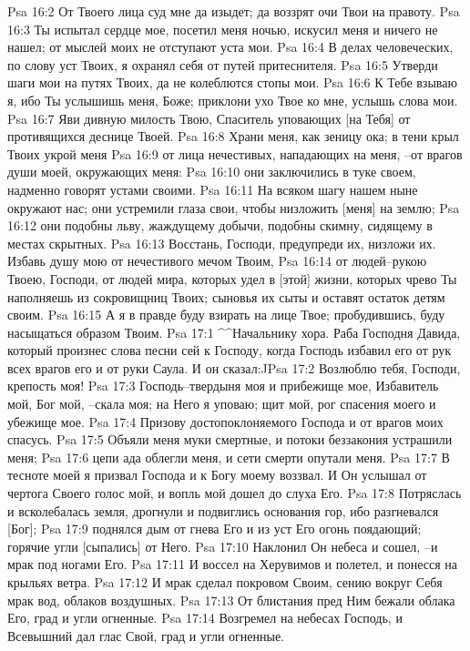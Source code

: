 Psa 16:2  От Твоего лица суд мне да изыдет; да воззрят очи Твои на правоту.
Psa 16:3  Ты испытал сердце мое, посетил меня ночью, искусил меня и ничего не нашел; от мыслей моих не отступают уста мои.
Psa 16:4  В делах человеческих, по слову уст Твоих, я охранял себя от путей притеснителя.
Psa 16:5  Утверди шаги мои на путях Твоих, да не колеблются стопы мои.
Psa 16:6  К Тебе взываю я, ибо Ты услышишь меня, Боже; приклони ухо Твое ко мне, услышь слова мои.
Psa 16:7  Яви дивную милость Твою, Спаситель уповающих [на Тебя] от противящихся деснице Твоей.
Psa 16:8  Храни меня, как зеницу ока; в тени крыл Твоих укрой меня
Psa 16:9  от лица нечестивых, нападающих на меня, --от врагов души моей, окружающих меня:
Psa 16:10  они заключились в туке своем, надменно говорят устами своими.
Psa 16:11  На всяком шагу нашем ныне окружают нас; они устремили глаза свои, чтобы низложить [меня] на землю;
Psa 16:12  они подобны льву, жаждущему добычи, подобны скимну, сидящему в местах скрытных.
Psa 16:13  Восстань, Господи, предупреди их, низложи их. Избавь душу мою от нечестивого мечом Твоим,
Psa 16:14  от людей--рукою Твоею, Господи, от людей мира, которых удел в [этой] жизни, которых чрево Ты наполняешь из сокровищниц Твоих; сыновья их сыты и оставят остаток детям своим.
Psa 16:15  А я в правде буду взирать на лице Твое; пробудившись, буду насыщаться образом Твоим.
Psa 17:1  ^^Начальнику хора. Раба Господня Давида, который произнес слова песни сей к Господу, когда Господь избавил его от рук всех врагов его и от руки Саула. И он сказал:^^
Psa 17:2  Возлюблю тебя, Господи, крепость моя!
Psa 17:3  Господь--твердыня моя и прибежище мое, Избавитель мой, Бог мой, --скала моя; на Него я уповаю; щит мой, рог спасения моего и убежище мое.
Psa 17:4  Призову достопоклоняемого Господа и от врагов моих спасусь.
Psa 17:5  Объяли меня муки смертные, и потоки беззакония устрашили меня;
Psa 17:6  цепи ада облегли меня, и сети смерти опутали меня.
Psa 17:7  В тесноте моей я призвал Господа и к Богу моему воззвал. И Он услышал от чертога Своего голос мой, и вопль мой дошел до слуха Его.
Psa 17:8  Потряслась и всколебалась земля, дрогнули и подвиглись основания гор, ибо разгневался [Бог];
Psa 17:9  поднялся дым от гнева Его и из уст Его огонь поядающий; горячие угли [сыпались] от Него.
Psa 17:10  Наклонил Он небеса и сошел, --и мрак под ногами Его.
Psa 17:11  И воссел на Херувимов и полетел, и понесся на крыльях ветра.
Psa 17:12  И мрак сделал покровом Своим, сению вокруг Себя мрак вод, облаков воздушных.
Psa 17:13  От блистания пред Ним бежали облака Его, град и угли огненные.
Psa 17:14  Возгремел на небесах Господь, и Всевышний дал глас Свой, град и угли огненные.
